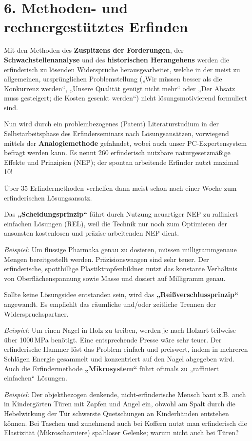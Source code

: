 \documentclass[11pt,a4paper]{article}
\begin{document}
\section*{6. Methoden- und rechnergestütztes Erfinden}

Mit den Methoden des \textbf{Zuspitzens der Forderungen}, der
\textbf{Schwachstellenanalyse} und des \textbf{historischen Herangehens}
werden die erfinderisch zu lösenden Widersprüche herausgearbeitet, welche in
der meist zu allgemeinen, ursprünglichen Problemstellung („Wir müssen besser
als die Konkurrenz werden“, „Unsere Qualität genügt nicht mehr“ oder „Der
Absatz muss gesteigert; die Kosten gesenkt werden“) nicht lösungsmotivierend
formuliert sind.

Nun wird durch ein problembezogenes (Patent) Literaturstudium in der
Selbstarbeitsphase des Erfinderseminars nach Lösungsansätzen, vorwiegend
mittels der \textbf{Analogiemethode} gefahndet, wobei auch unser
PC-Expertensystem befragt werden kann.  Es nennt 260 erfinderisch nutzbare
naturgesetzmäßige Effekte und Prinzipien (NEP); der spontan arbeitende
Erfinder nutzt maximal 10!

Über 35 Erfindermethoden verhelfen dann meist schon nach einer Woche zum
erfinderischen Lösungsansatz.

Das \textbf{„Scheidungsprinzip“} führt durch Nutzung neuartiger NEP zu
raffiniert einfachen Lösungen (REL), weil die Technik nur noch zum
Optimieren der ansonsten kostenlosen und präzise arbeitenden NEP dient.

\emph{Beispiel:} Um flüssige Pharmaka genau zu dosieren, müssen
milligrammgenaue Mengen bereitgestellt werden.  Präzisionswaagen sind sehr
teuer.  Der erfinderische, spottbillige Plastiktropfenbildner nutzt das
konstante Verhältnis von Oberflächenspannung sowie Masse und dosiert auf
Milligramm genau.

Sollte keine Lösungsidee entstanden sein, wird das
\textbf{„Reißverschlussprinzip“} angewandt. Es empfiehlt das räumliche
und/oder zeitliche Trennen der Widerspruchspartner.

\emph{Beispiel:} Um einen Nagel in Holz zu treiben, werden je nach Holzart
teilweise über 1000\,MPa benötigt.  Eine entsprechende Presse wäre sehr
teuer. Der erfinderische Hammer löst das Problem einfach und preiswert, indem
in mehreren Schlägen Energie gesammelt und konzentriert auf den Nagel
abgegeben wird.  Auch die Erfindermethode \textbf{„Mikrosystem“} führt oftmals
zu „raffiniert einfachen“ Lösungen.

\emph{Beispiel:} Der objekthezogen denkende, nicht-erfinderische Mensch baut
z.B. auch in Kindergärten Türen mit Zapfen und Angel ein, obwohl am Spalt
durch die Hebelwirkung der Tür schwerste Quetschungen an Kinderhänden
entstehen können.  Bei Taschen und zunehmend auch bei Koffern nutzt man
erfinderisch die Elastizität (Mikroscharniere) spaltloser Gelenke; warum nicht
auch bei Türen?
\end{document}
